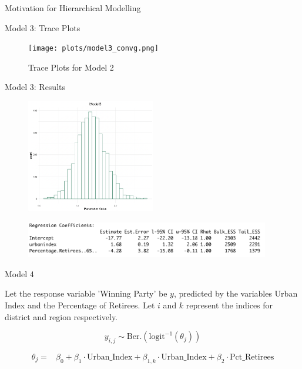 \documentclass{beamer}
\begin{document}
\begin{frame}{Motivation for Hierarchical Modelling}
\begin{frame}{Model 3: Trace Plots}
    \begin{center}
        \begin{figure}
            \texttt{[image: plots/model3\_convg.png]}
            \caption{Trace Plots for Model 2}
        \end{figure}
    \end{center}
\end{frame}


\begin{frame}{Model 3: Results}
    \begin{figure}
        \includegraphics[width=0.5\textwidth]{plots/model3_postui.png}
    \end{figure}
    \begin{figure}
        \includegraphics[width=0.95\textwidth]{plots/model3_coeff.png}
    \end{figure}
\end{frame}


\begin{frame}{Model 4}

    Let the response variable 'Winning Party' be \(y\), predicted by the variables Urban Index and the Percentage of Retirees. Let \(i\) and \(k\) represent the indices for district and region respectively.

    \[
    y_{i,j} \sim \text{Ber.}\left(\text{logit}^{-1}(\theta_{j})\right)
    \]

\[
\begin{aligned}
\theta_{j} =    &\beta_0 + \beta_1 \cdot \text{Urban\_Index} + \beta_{1,k} \cdot \text{Urban\_Index} + \beta_2 \cdot \text{Pct\_Retirees}
\end{aligned}
\]


\end{frame}
\end{frame}
\end{document}
